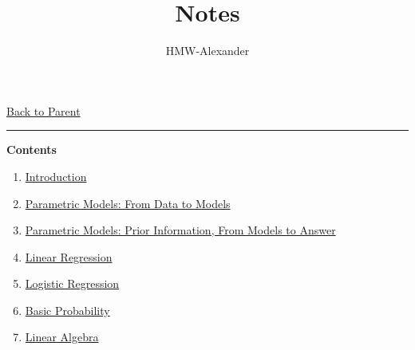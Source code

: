 \documentclass[letterpaper,11pt]{article}
\title{\textbf{Notes}}
\author{HMW-Alexander}
\newcommand{\panhline}{\begin{center}\rule{\textwidth}{1pt}\end{center}}
\begin{document}
\maketitle
\href{../index.html}{Back to Parent}

\panhline
\textbf{Contents}

\begin{enumerate}
	\item \href{./01_Introduction/document.html}{Introduction}
	\item \href{./02_ParametricModels/document.html}{Parametric Models: From Data to Models}
	\item \href{./03_ParametricModels/document.html}{Parametric Models: Prior Information, From Models to Answer}
	\item \href{./04_LinearRegression/document.html}{Linear Regression}
	\item \href{./05_LogisticRegression/document.html}{Logistic Regression}
	\item \href{./R1_BasicProbability/document.html}{Basic Probability}
	\item \href{./R2_LinearAlgebra/document.html}{Linear Algebra}
\end{enumerate}
\end{document}
